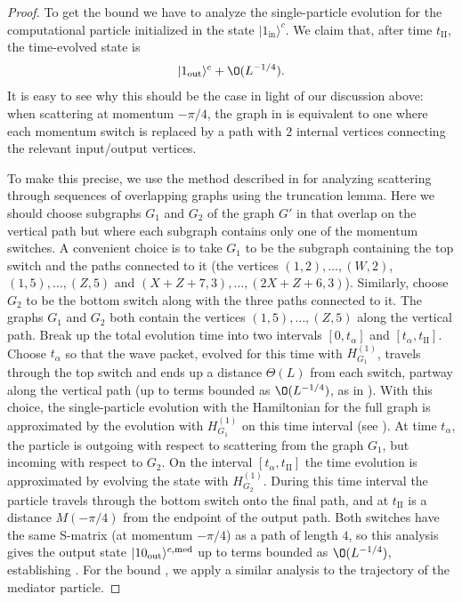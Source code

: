 \documentclass[../thesis-main/thesis-main]{subfiles}
\begin{document}
\begin{proof}
To get the bound  we have to analyze the single-particle evolution
for the computational particle initialized in the state $|1_\text{in}\rangle^c$. 
We claim that, after time $t_{\mathrm{II}}$, the time-evolved state is
\begin{align}
|1_\text{out}\rangle^c+\O(L^{-{1}/{4}}).
\end{align}
It is easy to see why this should be the case in light of our discussion above: when scattering at momentum $-{\pi}/{4}$, the graph in  is equivalent to one where each momentum switch is replaced by a path with $2$ internal vertices connecting the relevant input/output vertices.

To make this precise, we use the method described in  for analyzing scattering through sequences of overlapping graphs using the truncation lemma. Here we should choose subgraphs $G_{1}$ and $G_{2}$ of the graph $G'$ in  that overlap on the vertical path but where each subgraph contains only one of the momentum switches. A convenient choice is to take $G_{1}$ to be the subgraph containing the top switch and the paths connected to it (the vertices $(1,2),\ldots,(W,2)$, $(1,5),\ldots,(Z,5)$ and $(X+Z+7,3),\ldots,(2X+Z+6,3)$). Similarly, choose $G_{2}$ to be the bottom switch along with the three paths connected to it. The graphs $G_{1}$ and $G_{2}$ both contain the vertices $(1,5),\ldots,(Z,5)$ along the vertical path. Break up the total evolution time into two intervals $[0,t_{\alpha}]$ and $[t_{\alpha},t_{\mathrm{II}}]$. Choose $t_{\alpha}$ so that the wave packet, evolved for this time with $H_{G_1}^{(1)}$, travels through the top switch and ends up a distance $\Theta(L)$ from each switch, partway along the vertical path (up to terms bounded as $\O(L^{-{1}/{4}})$, as in ). With this choice, the single-particle evolution with the Hamiltonian for the full graph is approximated by the evolution with $H_{G_1}^{(1)}$ on this time interval (see ). At time $t_\alpha$, the particle is outgoing with respect to scattering from the graph $G_1$, but incoming with respect to $G_2$. On the interval $[t_{\alpha},t_{\mathrm{II}}]$ the time evolution is approximated by evolving the state with $H_{G_2}^{(1)}$. During this time interval the particle travels through the bottom switch onto the final path, and at $t_{\mathrm{II}}$ is a distance $M(-{\pi}/{4})$ from the endpoint of the output path. Both switches have the same S-matrix (at momentum $-{\pi}/{4}$) as a path of length $4$, so this analysis gives the output state $|10_\text{out}\rangle^{c,\text{med}}$ up to terms bounded as $\O(L^{-{1}/{4}})$, establishing . For the bound , we apply a similar analysis to the trajectory of the mediator particle.


\end{proof}
\end{document}
